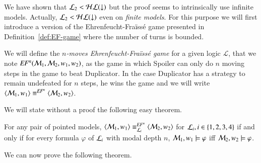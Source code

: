We have shown that $\mathcal{L}_2 < \mathcal{HL}({\downarrow})$ but the proof seems to
intrinsically use infinite models.  Actually, $\mathcal{L}_2 < \mathcal{HL}({\downarrow})$
even on \emph{finite models}. For this purpose we will first
introduce a version of the Ehrenfeucht-Fra\"iss\'e
game presented in Definition~\ref{def:EF-game} where the number of
turns is bounded.

\begin{defn}
We will define the \emph{$n$-moves Ehrenfeucht-Fra\"iss\'e game} for
a given logic $\mathcal{L}$, that we note $\mathit{EF}^n(\mathcal{M}_1, \mathcal{M}_2,
w_1, w_2)$, as the game in which Spoiler can only do $n$ moving
steps in the game to beat Duplicator. In the case Duplicator has a
strategy to remain undefeated for $n$ steps, he wins the game and we
will write $\langle \mathcal{M}_1,w_1 \rangle\equiv^{\mathit{EF}^n}\langle \mathcal{M}_2,w_2 \rangle$.
\end{defn}

We will state without a proof the following easy theorem.

\begin{thm}
For any pair of pointed models, $\langle \mathcal{M}_1,w_1 \rangle\equiv^{\mathit{EF}^n}_{\mathcal{L}_i}\langle \mathcal{M}_2,w_2 \rangle$ for $\mathcal{L}_i, i \in \{1,2,3,4\}$ if and only if for every formula $\varphi$ of $\mathcal{L}_i$ with modal depth $n$, $\mathcal{M}_1,w_1\models\varphi$ iff $\mathcal{M}_2,w_2\models\varphi$.
\end{thm}

We can now prove the following theorem.

